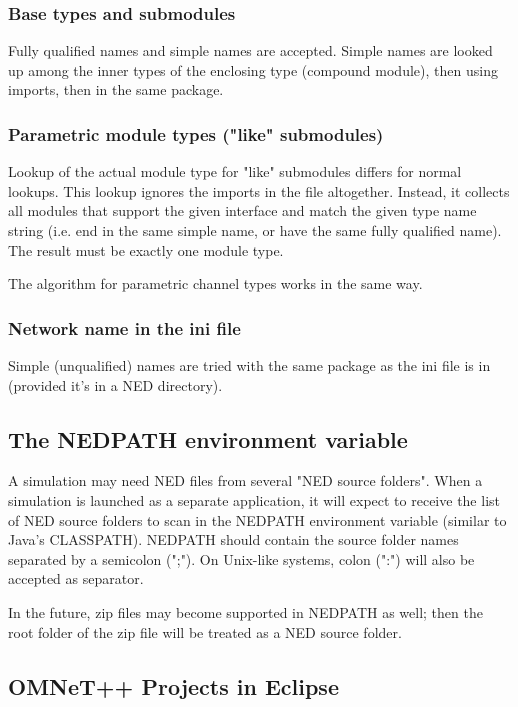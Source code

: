 \subsubsection{Base types and submodules}

Fully qualified names and simple names are accepted. Simple names
are looked up among the inner types of the enclosing type (compound
module), then using imports, then in the same package.


\subsubsection{Parametric module types ("like" submodules)}

Lookup of the actual module type for "like" submodules differs for normal
lookups. This lookup ignores the imports in the file altogether.
Instead, it collects all modules that support the given interface
and match the given type name string (i.e. end in the same simple name,
or have the same fully qualified name). The result must be exactly
one module type.

The algorithm for parametric channel types works in the same way.


\subsubsection{Network name in the ini file}

Simple (unqualified) names are tried with the same package as the
ini file is in (provided it's in a NED directory).



\subsection{The NEDPATH environment variable}

A simulation may need NED files from several "NED source folders".
When a simulation is launched as a separate application, it will expect
to receive the list of NED source folders to scan in the NEDPATH
environment variable (similar to Java's CLASSPATH). NEDPATH should
contain the source folder names separated by a semicolon (";").
On Unix-like systems, colon (":") will also be accepted as separator.

In the future, zip files may become supported in NEDPATH as well;
then the root folder of the zip file will be treated as a NED source
folder.


\subsection{OMNeT++ Projects in Eclipse}

